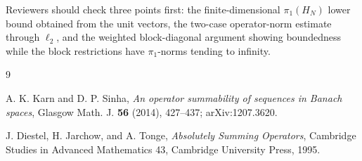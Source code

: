 \documentclass[11pt]{article}
\newcommand{\piOne}{\pi_1}
\begin{document}
Reviewers should check three points first: the finite-dimensional
\(\piOne(H_N)\) lower bound obtained from the unit vectors, the two-case
operator-norm estimate through \(\ell_2\), and the weighted block-diagonal
argument showing boundedness while the block restrictions have
\(\piOne\)-norms tending to infinity.

\begin{thebibliography}{9}

A. K. Karn and D. P. Sinha,
\emph{An operator summability of sequences in Banach spaces},
Glasgow Math. J. \textbf{56} (2014), 427--437; arXiv:1207.3620.

J. Diestel, H. Jarchow, and A. Tonge,
\emph{Absolutely Summing Operators},
Cambridge Studies in Advanced Mathematics 43, Cambridge University Press,
1995.

\end{thebibliography}
\end{document}
